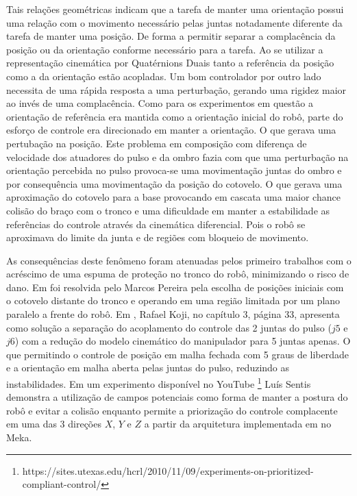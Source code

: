 Tais relações geométricas indicam que a tarefa de manter uma orientação possui uma relação com o movimento necessário pelas juntas notadamente diferente da tarefa de manter uma posição. De forma a permitir separar a complacência da posição ou da orientação conforme necessário para a tarefa. Ao se utilizar a representação cinemática por Quatérnions Duais tanto a referência da posição como a da orientação estão acopladas. Um bom controlador por outro lado necessita de uma rápida resposta a uma perturbação, gerando uma rigidez maior ao invés de uma complacência. Como para os experimentos em questão a orientação de referência era mantida como a orientação inicial do robô, parte do esforço de controle era direcionado em manter a orientação. O que gerava uma pertubação na posição. Este problema em composição com diferença de velocidade dos atuadores do pulso e da ombro fazia com que uma perturbação na orientação percebida no pulso provoca-se uma movimentação juntas do ombro e por consequência uma movimentação da posição do cotovelo. O que gerava uma aproximação do cotovelo para a base provocando em cascata uma maior chance colisão do braço com o tronco e uma dificuldade em manter a estabilidade as referências do controle através da cinemática diferencial. Pois o robô se aproximava do limite da junta e de regiões com bloqueio de movimento.

As consequências deste fenômeno foram atenuadas pelos primeiro trabalhos com o acréscimo de uma espuma de proteção no tronco do robô, minimizando o risco de dano. Em \cite{marcosps2016} foi resolvida pelo Marcos Pereira pela escolha de posições iniciais com o cotovelo distante do tronco e operando em uma região limitada por um plano paralelo a frente do robô. Em \cite{koji2017}, Rafael Koji, no capítulo 3, página 33, apresenta como solução a separação do acoplamento do controle das 2 juntas do pulso ($j5$ e $j6$) com a redução do modelo cinemático do manipulador para 5 juntas apenas. O que permitindo o controle de posição em malha fechada com 5 graus de liberdade e a orientação em malha aberta pelas juntas do pulso, reduzindo as instabilidades. Em um experimento disponível no YouTube \footnote{https://sites.utexas.edu/hcrl/2010/11/09/experiments-on-prioritized-compliant-control/} Luís Sentis demonstra a utilização de campos potenciais como forma de manter a postura do robô e evitar a colisão enquanto permite a priorização do controle complacente em uma das 3 direções $X$, $Y$ e $Z$ a partir da arquitetura implementada em \cite{sentis2007synthesis} no Meka.

